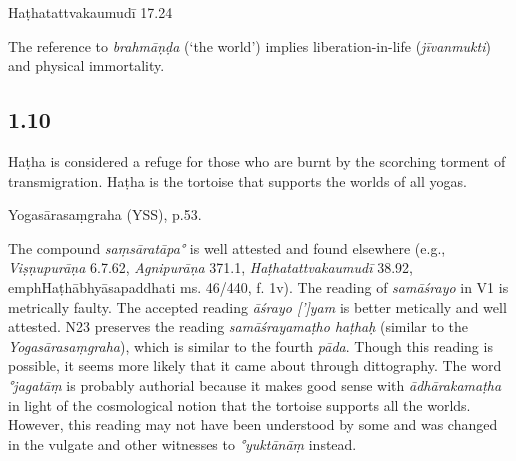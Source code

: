 \begin{ekdosis}
\begin{testimonia}[hp01_009]
Haṭhatattvakaumudī 17.24

\begin{versinnote}
\end{versinnote}

\end{testimonia}

\begin{philcomm}[hp01_009]        
The reference to \emph{brahmāṇḍa} (‘the world’) implies liberation-in-life (\emph{jīvanmukti}) and physical immortality.  
\end{philcomm}

\subsection*{1.10}
\begin{translation}[hp01_010]
Haṭha is considered a refuge for those who are burnt by the scorching torment of transmigration. Haṭha is the tortoise that supports the worlds of all yogas.
\end{translation}

\begin{testimonia}[hp01_010]
Yogasārasaṃgraha (YSS), p.53.

\begin{versinnote}
\end{versinnote}

\end{testimonia}

\begin{philcomm}[hp01_010] 
The compound \emph{saṃsāratāpa°} is well attested and found elsewhere (e.g., \emph{Viṣṇupurāṇa} 6.7.62, \emph{Agnipurāṇa} 371.1, \emph{Haṭhatattvakaumudī} 38.92, emph{Haṭhābhyāsapaddhati} ms. 46/440, f. 1v). The reading of \emph{samāśrayo} in V1 is metrically faulty. The accepted reading \emph{āśrayo [']yam} is better metically and well attested. N23 preserves the reading \emph{samāśrayamaṭho haṭhaḥ} (similar to the \emph{Yogasārasaṃgraha}), which is similar to the fourth \emph{pāda}. Though this reading is possible, it seems more likely that it came about through dittography. The word \emph{°jagatāṃ} is probably authorial because it makes good sense with  \emph{ādhārakamaṭha} in light of the cosmological notion that the tortoise supports all the worlds. However, this reading may not have been understood by some and was changed in the vulgate and other witnesses to \emph{°yuktānāṃ} instead.      
\end{philcomm}


\end{ekdosis}
